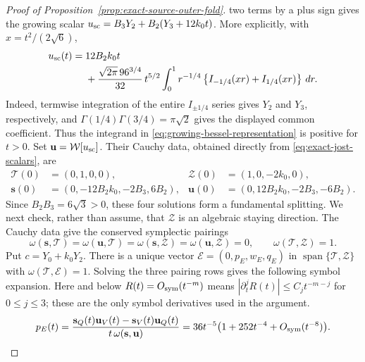 \documentclass[11pt]{amsart}
\numberwithin{equation}{section}
\theoremstyle{definition}
\theoremstyle{remark}
\begin{document}
\begin{proof}[Proof of Proposition~\ref{prop:exact-source-outer-fold}]
two terms by a plus sign gives the growing scalar
$u_{\rm sc}=B_3Y_2+B_2(Y_3+12k_0t)$.  More explicitly, with
$x=t^2/(2\sqrt6)$,
\begin{equation}\label{eq:growing-bessel-representation}
 \begin{split}
 u_{\rm sc}(t)
  ={}&12B_2k_0t\\
    &+\frac{\sqrt{2\pi}\,96^{3/4}}{32}\,t^{5/2}
      \int_0^1 r^{-1/4}
       \left\{I_{-1/4}(xr)+I_{1/4}(xr)\right\}\,dr.
 \end{split}
\end{equation}
Indeed, termwise integration of the entire $I_{\pm1/4}$ series gives
$Y_2$ and $Y_3$, respectively, and
$\Gamma(1/4)\Gamma(3/4)=\pi\sqrt2$ gives the displayed common
coefficient.  Thus the integrand in
\eqref{eq:growing-bessel-representation} is positive for $t>0$.
Set $\mathbf u=\mathcal W[u_{\rm sc}]$.
Their Cauchy data, obtained directly from
\eqref{eq:exact-jost-scalars}, are
\begin{equation}\label{eq:jost-cauchy-data}
 \begin{aligned}
 \mathcal T(0)&=(0,1,0,0),&
 \mathcal Z(0)&=(1,0,-2k_0,0),\\
 \mathbf s(0)&=(0,-12B_2k_0,-2B_3,6B_2),&
 \mathbf u(0)&=(0,12B_2k_0,-2B_3,-6B_2).
 \end{aligned}
\end{equation}
Since $B_2B_3=6\sqrt3>0$, these four solutions form a fundamental
splitting.  We next check, rather than assume, that $\mathcal Z$ is an
algebraic staying direction.  The Cauchy data give the conserved symplectic
pairings
\begin{equation}\label{eq:jost-symplectic-pairings}
 \omega(\mathbf s,\mathcal T)=\omega(\mathbf u,\mathcal T)
 =\omega(\mathbf s,\mathcal Z)=\omega(\mathbf u,\mathcal Z)=0,
 \qquad \omega(\mathcal T,\mathcal Z)=1.
\end{equation}
Put $c=Y_0+k_0Y_2$.  There is a unique vector
$\mathcal E=(0,p_E,w_E,q_E)$ in
$\operatorname{span}\{\mathcal T,\mathcal Z\}$ with
$\omega(\mathcal T,\mathcal E)=1$.  Solving the three pairing rows gives
the following symbol expansion.  Here and below
$R(t)=O_{\rm sym}(t^{-m})$ means
$|\partial_t^jR(t)|\le C_jt^{-m-j}$ for $0\le j\le3$; these are the only
symbol derivatives used in the argument.
\begin{equation}\label{eq:jost-algebraic-p}
 p_E(t)=
 \frac{\mathbf s_Q(t)\mathbf u_V(t)
       -\mathbf s_V(t)\mathbf u_Q(t)}
      {t\,\omega(\mathbf s,\mathbf u)}
 =36t^{-5}\bigl(1+252t^{-4}+O_{\rm sym}(t^{-8})\bigr).
\end{equation}

\end{proof}
\end{document}
